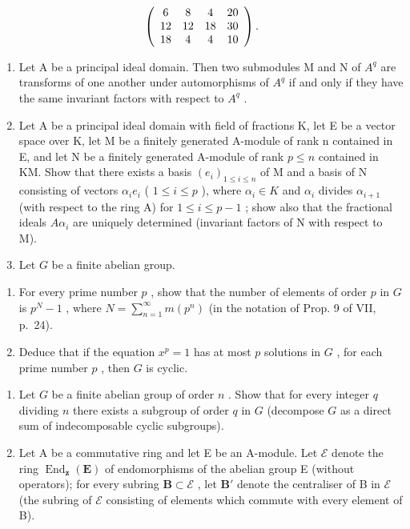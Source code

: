 \[
\left( \begin{array}{c c c c} 6 & 8 & 4 & 20 \\ 12 & 12 & 18 & 30 \\ 18 & 4 & 4 & 10 \end{array} \right).
\]

\begin{enumerate}
\def\labelenumi{\arabic{enumi})}
\setcounter{enumi}{1}
\item
  Let A be a principal ideal domain. Then two submodules M and N of \(A^{q}\) are transforms of one another under automorphisms of \(A^{q}\) if and only if they have the same invariant factors with respect to \(A^{q}\) .
\item
  Let A be a principal ideal domain with field of fractions K, let E be a vector space over K, let M be a finitely generated A-module of rank n contained in E, and let N be a finitely generated A-module of rank \(p \leqslant n\) contained in KM. Show that there exists a basis \((e_{i})_{1 \leqslant i \leqslant n}\) of M and a basis of N consisting of vectors \(\alpha_{i}e_{i}\) ( \(1 \leqslant i \leqslant p\) ), where \(\alpha_{i} \in K\) and \(\alpha_{i}\) divides \(\alpha_{i+1}\) (with respect to the ring A) for \(1 \leqslant i \leqslant p - 1\) ; show also that the fractional ideals \(A\alpha_{i}\) are uniquely determined (invariant factors of N with respect to M).
\item
  Let \(G\) be a finite abelian group.
\end{enumerate}

\begin{enumerate}
\def\labelenumi{\alph{enumi})}
\item
  For every prime number \(p\) , show that the number of elements of order \(p\) in \(G\) is \(p^N - 1\) , where \(N = \sum_{n=1}^{\infty} m(p^n)\) (in the notation of Prop. 9 of VII, p.~24).
\item
  Deduce that if the equation \(x^p = 1\) has at most \(p\) solutions in \(G\) , for each prime number \(p\) , then \(G\) is cyclic.
\end{enumerate}

\begin{enumerate}
\def\labelenumi{\arabic{enumi})}
\setcounter{enumi}{4}
\item
  Let \(G\) be a finite abelian group of order \(n\) . Show that for every integer \(q\) dividing \(n\) there exists a subgroup of order \(q\) in \(G\) (decompose \(G\) as a direct sum of indecomposable cyclic subgroups).
\item
  Let A be a commutative ring and let E be an A-module. Let \(\mathcal{E}\) denote the ring \(\operatorname{End}_{\mathbf{z}}(\mathbf{E})\) of endomorphisms of the abelian group E (without operators); for every subring \(\mathbf{B} \subset \mathcal{E}\) , let \(\mathbf{B}'\) denote the centraliser of B in \(\mathcal{E}\) (the subring of \(\mathcal{E}\) consisting of elements which commute with every element of B).
\end{enumerate}


